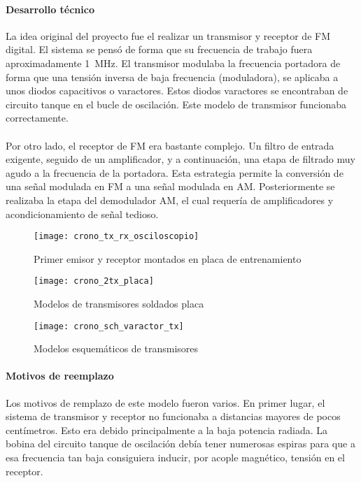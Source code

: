 \paragraph{Desarrollo técnico}
La idea original del proyecto fue el realizar un transmisor y receptor de FM digital. El sistema se pensó de forma que su frecuencia de trabajo fuera aproximadamente \SI{1}{\mega\hertz}. 
El transmisor modulaba la frecuencia portadora de forma que una tensión inversa de baja frecuencia (moduladora), se aplicaba a unos diodos capacitivos o varactores. Estos diodos varactores se encontraban de circuito tanque en el bucle de oscilación.
Este modelo de transmisor funcionaba correctamente.

\paragraph{}
Por otro lado, el receptor de FM era bastante complejo. Un filtro de entrada exigente, seguido de un amplificador, y a continuación, una etapa de filtrado muy agudo a la frecuencia de la portadora. Esta estrategia permite la conversión de una señal modulada en FM a una señal modulada en AM. Posteriormente se realizaba la etapa del demodulador AM, el cual requería de amplificadores y acondicionamiento de señal tedioso.  
\begin{figure}[h]
    \centering
    \texttt{[image: crono\_tx\_rx\_osciloscopio]}
    \caption{Primer emisor y receptor montados en placa de entrenamiento}
    \label{fig:crono_tx_rx_osciloscopio}
\end{figure}

\begin{figure}[h]
    \centering
    \texttt{[image: crono\_2tx\_placa]}
    \caption{Modelos de transmisores soldados placa}
    \label{fig:crono_2tx_placa}
\end{figure}

\begin{figure}[h]
    \centering
    \texttt{[image: crono\_sch\_varactor\_tx]}
    \caption{Modelos esquemáticos de transmisores} 
    \label{fig:crono_sch_varactor_tx}
\end{figure}

\paragraph{Motivos de reemplazo}
Los motivos de remplazo de este modelo fueron varios.
En primer lugar, el sistema de transmisor y receptor no funcionaba a distancias mayores de pocos centímetros. Esto era debido principalmente a la baja potencia radiada. La bobina del circuito tanque de oscilación debía tener numerosas espiras para que a esa frecuencia tan baja consiguiera inducir, por acople magnético, tensión en el receptor.
